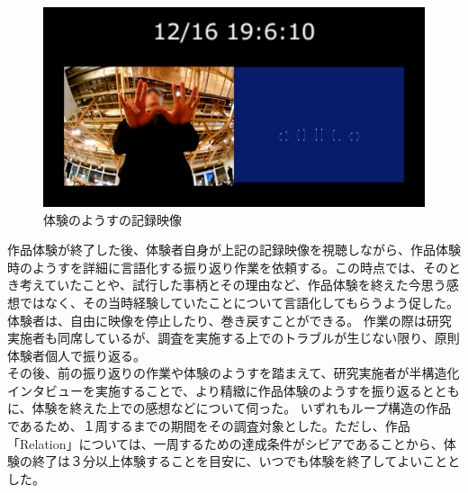 \begin{figure}[H]
  \centering
  \includegraphics[width=15cm]{img/record_monitor.jpg}
  \caption{体験のようすの記録映像}
  \label{fig:record_monitor}
\end{figure}

作品体験が終了した後、体験者自身が上記の記録映像を視聴しながら、作品体験時のようすを詳細に言語化する振り返り作業を依頼する。この時点では、そのとき考えていたことや、試行した事柄とその理由など、作品体験を終えた今思う感想ではなく、その当時経験していたことについて言語化してもらうよう促した。体験者は、自由に映像を停止したり、巻き戻すことができる。
作業の際は研究実施者も同席しているが、調査を実施する上でのトラブルが生じない限り、原則体験者個人で振り返る。\\
その後、前の振り返りの作業や体験のようすを踏まえて、研究実施者が半構造化インタビューを実施することで、より精緻に作品体験のようすを振り返るとともに、体験を終えた上での感想などについて伺った。
いずれもループ構造の作品であるため、１周するまでの期間をその調査対象とした。ただし、作品「Relation」については、一周するための達成条件がシビアであることから、体験の終了は３分以上体験することを目安に、いつでも体験を終了してよいこととした。

